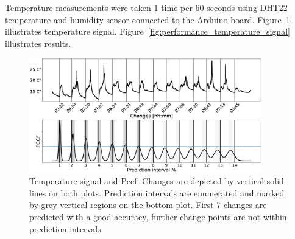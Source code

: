 Temperature measurements were taken 1 time per 60 seconds using DHT22 temperature and humidity sensor connected to the Arduino board.
Figure~\ref{fig:temperature_signal} illustrates temperature signal.
Figure~\ref{fig:performance_temperature_signal} illustrates results.
\begin{figure}[!htb]
	\centering
	\includegraphics[width=0.9\textwidth]{articles/pics/journal_paper/temperature_signal}
	\caption{
    Temperature signal and Pccf.
    Changes are depicted by vertical solid lines on both plots.
    Prediction intervals are enumerated and marked by grey vertical regions on the bottom plot. First 7 changes are predicted with a good accuracy, further change points are not within prediction intervals.
  }
	\label{fig:temperature_signal}
\end{figure}
